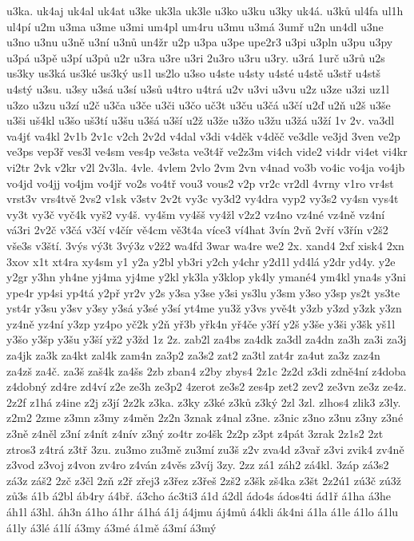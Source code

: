 {u3ka.
uk4aj
uk4al
uk4at
u3ke
uk3la
uk3le
u3ko
u3ku
u3ky
uk4á.
u3ků
ul4fa
ul1h
ul4pí
u2m
u3ma
u3me
u3mi
um4pl
um4ru
u3mu
u3má
3umř
u2n
un4dl
u3ne
u3no
u3nu
u3ně
u3ní
u3nů
un4žr
u2p
u3pa
u3pe
upe2r3
u3pi
u3pln
u3pu
u3py
u3pá
u3pě
u3pí
u3pů
u2r
u3ra
u3re
u3ri
2u3ro
u3ru
u3ry.
u3rá
1urč
u3rů
u2s
us3ky
us3ká
us3ké
us3ký
us1l
us2lo
u3so
u4ste
u4sty
u4sté
u4stě
u3stř
u4stš
u4stý
u3su.
u3sy
u3sá
u3sí
u3sů
u4tro
u4trá
u2v
u3vi
u3vu
u2z
u3ze
u3zi
uz1l
u3zo
u3zu
u3zí
u2č
u3ča
u3če
u3či
u3čo
uč3t
u3ču
u3čá
u3čí
u2ď
u2ň
u2š
u3še
u3ši
uš4kl
u3šo
uš3tí
u3šu
u3šá
u3ší
u2ž
u3že
u3žo
u3žu
u3žá
u3ží
1v
2v.
va3dl
va4jť
va4kl
2v1b
2v1c
v2ch
2v2d
v4dal
v3di
v4děk
v4děč
ve3dle
ve3jd
3ven
ve2p
ve3ps
vep3ř
ves3l
ve4sm
ves4p
ve3sta
ve3t4ř
ve2z3m
vi4ch
vide2
vi4dr
vi4et
vi4kr
vi2tr
2vk
v2kr
v2l
2v3la.
4vle.
4vlem
2vlo
2vm
2vn
v4nad
vo3b
vo4ic
vo4ja
vo4jb
vo4jd
vo4jj
vo4jm
vo4jř
vo2s
vo4tř
vou3
vous2
v2p
vr2c
vr2dl
4vrny
v1ro
vr4st
vrst3v
vrs4tvě
2vs2
v1sk
v3stv
2v2t
vy3c
vy3d2
vy4dra
vyp2
vy3s2
vy4sn
vys4t
vy3t
vy3č
vyč4k
vyš2
vy4š.
vy4šm
vy4šš
vy4žl
v2z2
vz4no
vz4né
vz4ně
vz4ní
vá3ri
2v2č
v3čá
v3čí
v4čír
vě4cm
vě3t4a
více3
ví4hat
3vín
2vň
2vří
v3řín
v2š2
vše3s
v3ští.
3výs
vý3t
3vý3z
v2ž2
wa4fd
3war
wa4re
we2
2x.
xand4
2xf
xisk4
2xn
3xov
x1t
xt4ra
xy4sm
y1
y2a
y2bl
yb3ri
y2ch
y4chr
y2d1l
yd4lá
y2dr
yd4y.
y2e
y2gr
y3hn
yh4ne
yj4ma
yj4me
y2kl
yk3la
y3klop
yk4ly
ymané4
ym4kl
yna4s
y3ni
ype4r
yp4si
yp4tá
y2př
yr2v
y2s
y3sa
y3se
y3si
ys3lu
y3sm
y3so
y3sp
ys2t
ys3te
yst4r
y3su
y3sv
y3sy
y3sá
y3sé
y3sí
yt4me
yu3ž
y3vs
yvě4t
y3zb
y3zd
y3zk
y3zn
yz4ně
yz4ní
y3zp
yz4po
yč2k
y2ň
yř3b
yřk4n
yř4če
y3ří
y2š
y3še
y3ši
y3šk
yš1l
y3šo
y3šp
y3šu
y3ší
yž2
y3žd
1z
2z.
zab2l
za4bs
za4dk
za3dl
za4dn
za3h
za3i
za3j
za4jk
za3k
za4kt
zal4k
zam4n
za3p2
za3s2
zat2
za3tl
zat4r
za4ut
za3z
zaz4n
za4zš
za4č.
za3š
zaš4k
za4šs
2zb
zban4
z2by
zbys4
2z1c
2z2d
z3di
zdně4ní
z4doba
z4dobný
zd4re
zd4ví
z2e
ze3h
ze3p2
4zerot
ze3s2
zes4p
zet2
zev2
ze3vn
ze3z
ze4z.
2z2f
z1há
z4ine
z2j
z3jí
2z2k
z3ka.
z3ky
z3ké
z3ků
z3ký
2zl
3zl.
zlhos4
zlik3
z3ly.
z2m2
2zme
z3mn
z3my
z4měn
2z2n
3znak
z4nal
z3ne.
z3nic
z3no
z3nu
z3ny
z3né
z3ně
z4něl
z3ní
z4nít
z4nív
z3ný
zo4tr
zo4šk
2z2p
z3pt
z4pát
3zrak
2z1s2
2zt
ztros3
z4trá
z3tř
3zu.
zu3mo
zu3mě
zu3mí
zu3š
z2v
zva4d
z3vař
z3vi
zvik4
zv4ně
z3vod
z3voj
z4von
zv4ro
z4ván
z4věs
z3víj
3zy.
2zz
zá1
záh2
zá4kl.
3záp
zá3s2
zá3z
záš2
2zč
z3čl
2zň
z2ř
zřej3
z3řez
z3řeš
2zš2
z3šk
zš4ka
z3št
2z2ú1
zú3č
zú3ž
zů3s
á1b
á2bl
áb4ry
á4bř.
á3cho
ác3ti3
á1d
á2dl
ádo4s
ádos4ti
ád1ř
á1ha
á3he
áh1l
á3hl.
áh3n
á1ho
á1hr
á1há
á1j
á4jmu
áj4mů
á4kli
ák4ni
á1la
á1le
á1lo
á1lu
á1ly
á3lé
á1lí
á3my
á3mé
á1mě
á3mí
á3mý
}
